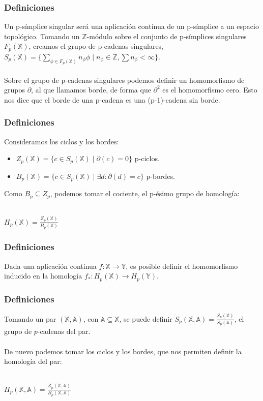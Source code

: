 \documentclass{beamer}
\def\X{{\mathbb X}}
\def\A{{\mathbb A}}
\def\Y{{\mathbb Y}}
\begin{document}

\begin{frame}
  \frametitle{Definiciones}
  Un p-símplice singular será una aplicación continua de un p-símplice a un espacio topológico.
  Tomando un $\mathbb{Z}$-módulo sobre el conjunto de p-símplices singulares $F_p(\X)$, creamos el grupo
  de p-cadenas singulares, $S_p(\X) = \{\sum\limits_{\phi \in F_p(\X)} n_{\phi} \phi \mid n_{\phi} \in \mathbb Z,  \sum n_\phi < \infty\}$.
  \\~\\
  Sobre el grupo de p-cadenas singulares podemos definir un homomorfismo de grupos $\partial$, al que llamamos borde,
  de forma que $\partial^2$ es el homomorfismo cero. Esto nos dice que el borde de una p-cadena es
  una (p-1)-cadena sin borde.

\end{frame}


\begin{frame}
  \frametitle{Definiciones}
  Consideramos los ciclos y los bordes:
  \begin{itemize}
    \item $Z_p(\X) = \{c \in S_p(\X) \mid \partial(c) = 0\}$ p-ciclos.
    \item $B_p(\X) = \{c \in S_p(\X) \mid \exists d \colon \partial(d) = c\}$ p-bordes.
  \end{itemize}

  Como $B_p \subseteq Z_p$, podemos tomar el cociente, el p-ésimo grupo de homología: \\~\\
  \centerline{$H_p(\X) = \frac{Z_p(\X)}{B_p(\X)}$}
\end{frame}

\begin{frame}
  \frametitle{Definiciones}
  Dada una aplicación continua $f \colon \X \to \Y$, es posible definir el homomorfismo inducido en
  la homología $f_* \colon H_p(\X) \to H_p(\Y)$.

\end{frame}


\begin{frame}
  \frametitle{Definiciones}
  Tomando un par $(\X, \A)$, con $\A \subseteq \X$, se puede definir $S_p(\X, \A) = \frac{S_p(\X)}{S_p(\A)}$,
  el grupo de $p$-cadenas del par. \\~\\

  De nuevo podemos tomar los ciclos y los bordes, que nos permiten definir la homología del par: \\~\\
  \centerline{$H_p(\X, \A) = \frac{Z_p(\X, \A)}{B_p(\X, \A)}$}

\end{frame}
\end{document}
